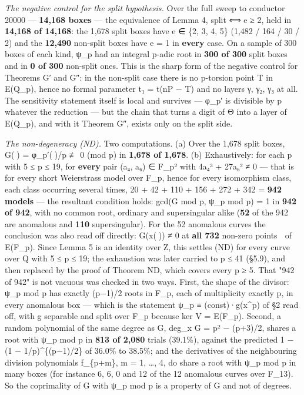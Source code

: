 \documentclass[11pt,a4paper]{article}
\theoremstyle{named}
\begin{document}
\textit{The negative control for the split hypothesis.} Over the full sweep to conductor 20000 — \textbf{14,168 boxes} — the equivalence of Lemma 4, split ⟺ e ≥ 2, held in \textbf{14,168 of 14,168}: the 1,678 split boxes have e ∈ \{2, 3, 4, 5\} (1,482 / 164 / 30 / 2) and the \textbf{12,490} non-split boxes have e = 1 in \textbf{every} case. On a sample of 300 boxes of each kind, ψ\_p had an integral p-adic root in \textbf{300 of 300} split boxes and in \textbf{0 of 300} non-split ones. This is the sharp form of the negative control for Theorems G′ and G″: in the non-split case there is no p-torsion point T in E(Q\_p), hence no formal parameter t₁ = t(nP − T) and no layers γ, γ₂, γ₃ at all. The sensitivity statement itself is local and survives — φ\_p′ is divisible by p whatever the reduction — but the chain that turns a digit of Θ into a layer of E(Q\_p), and with it Theorem G″, exists only on the split side.

\textit{The non-degeneracy (ND).} Two computations. (a) Over the 1,678 split boxes, G() = φ\_p′()/p ≢ 0 (mod p) in \textbf{1,678 of 1,678}. (b) Exhaustively: for each p with 5 ≤ p ≤ 19, for \textbf{every} pair (a₄, a₆) ∈ F\_p² with 4a₄³ + 27a₆² ≠ 0 — that is for every short Weierstrass model over F\_p, hence for every isomorphism class, each class occurring several times, 20 + 42 + 110 + 156 + 272 + 342 = \textbf{942 models} — the resultant condition holds: gcd(G mod p, ψ\_p mod p) = 1 in \textbf{942 of 942}, with no common root, ordinary and supersingular alike (\textbf{52} of the 942 are anomalous and \textbf{110} supersingular). For the 52 anomalous curves the conclusion was also read off directly: G(x()) ≠ 0 at \textbf{all 732} non-zero points  of E(F\_p). Since Lemma 5 is an identity over Z, this settles (ND) for every curve over Q with 5 ≤ p ≤ 19; the exhaustion was later carried to p ≤ 41 (§5.9), and then replaced by the proof of Theorem ND, which covers every p ≥ 5. That "942 of 942" is not vacuous was checked in two ways. First, the shape of the divisor: ψ\_p mod p has exactly (p−1)/2 roots in F\_p, each of multiplicity exactly p, in every anomalous box — which is the statement ψ\_p ≡ (const)·g(x\textasciicircum{}p) of §2 read off, with g separable and split over F\_p because ker V = E(F\_p). Second, a random polynomial of the same degree as G, deg\_x G = p² − (p+3)/2, shares a root with ψ\_p mod p in \textbf{813 of 2,080} trials (39.1\%), against the predicted 1 − (1 − 1/p)\textasciicircum{}\{(p−1)/2\} of 36.0\% to 38.5\%; and the derivatives of the neighbouring division polynomials f\_\{p+m\}, m = 1, …, 4, do share a root with ψ\_p mod p in many boxes (for instance 6, 6, 0 and 12 of the 12 anomalous curves over F\_13). So the coprimality of G with ψ\_p mod p is a property of G and not of degrees.
\end{document}
